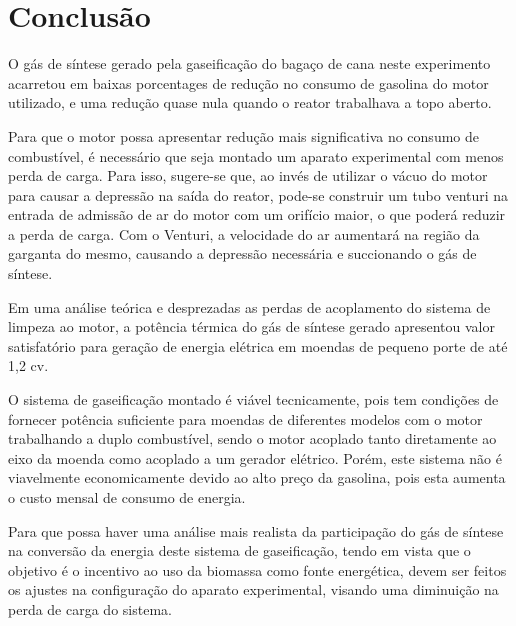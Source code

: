\chapter[Conclusão]{Conclusão}

O gás de síntese gerado pela gaseificação do bagaço de cana neste experimento acarretou em baixas porcentages de redução no consumo de gasolina do motor utilizado, e uma redução quase nula quando o reator trabalhava a topo aberto.

Para que o motor possa apresentar redução mais significativa no consumo de combustível, é necessário que seja montado um aparato experimental com menos perda de carga. Para isso, sugere-se que, ao invés de utilizar o vácuo do motor para causar a depressão na saída do reator, pode-se construir um tubo venturi na entrada de admissão de ar do motor com um orifício maior, o que poderá reduzir a perda de carga. Com o Venturi, a velocidade do ar aumentará na região da garganta do mesmo, causando a depressão necessária e succionando o gás de síntese.

Em uma análise teórica e desprezadas as perdas de acoplamento do sistema de limpeza ao motor, a potência térmica do gás de síntese gerado apresentou valor satisfatório para geração de energia elétrica em moendas de pequeno porte de até 1,2 cv.

O sistema de gaseificação montado é viável tecnicamente, pois tem condições de fornecer potência suficiente para moendas de diferentes modelos com o motor trabalhando a duplo combustível, sendo o motor acoplado tanto diretamente ao eixo da moenda como acoplado a um gerador elétrico. Porém, este sistema não é viavelmente economicamente devido ao alto preço da gasolina, pois esta aumenta o custo mensal de consumo de energia.

Para que possa haver uma análise mais realista da participação do gás de síntese na conversão da energia deste sistema de gaseificação, tendo em vista que o objetivo é o incentivo ao uso da biomassa como fonte energética, devem ser feitos os ajustes na configuração do aparato experimental, visando uma diminuição na perda de carga do sistema.